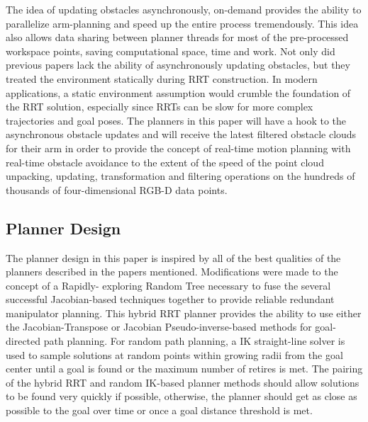 \documentclass[conference]{IEEEtran} \usepackage[T1]{fontenc} \usepackage[backend=biber, style=ieee]{biblatex}
\begin{document}
The idea of updating obstacles asynchronously, on-demand provides the ability to parallelize arm-planning and speed up the entire process tremendously. This idea also 
allows data sharing between planner threads for most of the pre-processed workspace points, saving computational space, time and work. Not only did previous papers lack 
the ability of asynchronously updating obstacles, but they treated the environment statically during RRT construction. In modern applications, a static environment
assumption would crumble the foundation of the RRT solution, especially since RRTs can be slow for more complex trajectories and goal poses. The planners in this paper 
will have a hook to the asynchronous obstacle updates and will receive the latest filtered obstacle clouds for their arm in order to provide the concept of real-time 
motion planning with real-time obstacle avoidance to the extent of the speed of the point cloud unpacking, updating, transformation and filtering operations on the 
hundreds of thousands of four-dimensional RGB-D data points.
 
\subsection{Planner Design}

The planner design in this paper is inspired by all of the best qualities of the planners described in the papers mentioned. Modifications were made to the concept of a Rapidly-
exploring Random Tree necessary to fuse the several successful Jacobian-based techniques together to provide reliable redundant manipulator planning. This hybrid 
RRT planner provides the ability to use either the Jacobian-Transpose or Jacobian Pseudo-inverse-based methods for goal-directed path planning. For random path planning, a IK
straight-line solver is used to sample solutions at random points within growing radii from the goal center until a goal is found or the maximum number of retires is met. 
The pairing of the hybrid RRT and random IK-based planner methods should allow solutions to be found very quickly if possible, otherwise, the planner should get as close as 
possible to the goal over time or once a goal distance threshold is met. 
\end{document}
